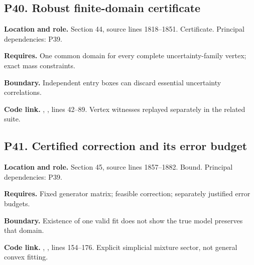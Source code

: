 \documentclass[11pt,letterpaper]{article}
\begin{document}
\par\noindent\begin{minipage}{\textwidth}
\subsection{P40. Robust finite-domain
certificate}\label{p40.-robust-finite-domain-certificate}

\textbf{Location and role.} Section 44, source lines 1818--1851.
Certificate. Principal dependencies: P39.

\textbf{Requires.} One common domain for every complete
uncertainty-family vertex; exact mass constraints.

\textbf{Boundary.} Independent entry boxes can discard essential
uncertainty correlations.

\textbf{Code link.} ,
, lines 42--89. Vertex witnesses replayed
separately in the related suite.
\end{minipage}\par\medskip

\par\noindent\begin{minipage}{\textwidth}
\subsection{P41. Certified correction and its error
budget}\label{p41.-certified-correction-and-its-error-budget}

\textbf{Location and role.} Section 45, source lines 1857--1882. Bound.
Principal dependencies: P39.

\textbf{Requires.} Fixed generator matrix; feasible correction;
separately justified error budgets.

\textbf{Boundary.} Existence of one valid fit does not show the true
model preserves that domain.

\textbf{Code link.} ,
, lines 154--176. Explicit simplicial
mixture sector, not general convex fitting.
\end{minipage}\par\medskip
\end{document}
